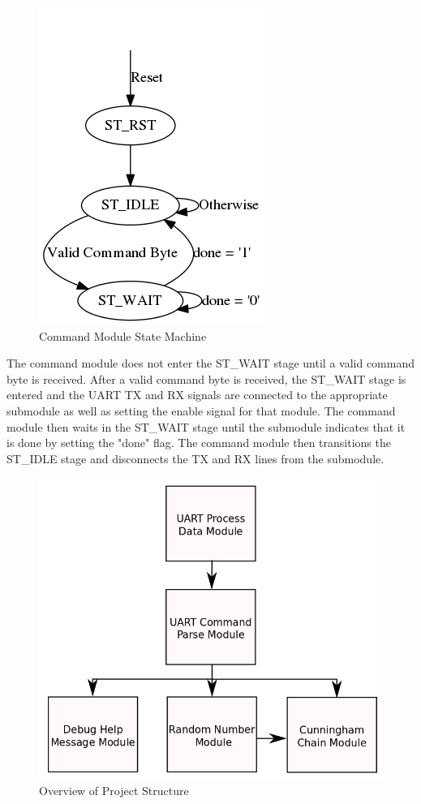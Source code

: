 \documentclass[journal]{IEEEtran}
\begin{document}
	\begin{figure}[h]
		\centering
		\includegraphics[scale=0.35]{graphviz/command_parse_state_diagram.png}
		\caption{Command Module State Machine}
	\end{figure}  

The command module does not enter the ST\_WAIT stage until a valid command byte is received. After a valid command byte is received, the ST\_WAIT stage is entered and the UART TX and RX signals are connected to the appropriate submodule as well as setting the enable signal for that module. The command module then waits in the ST\_WAIT stage until the submodule indicates that it is done by setting the "done" flag. The command module then transitions the ST\_IDLE stage and disconnects the TX and RX lines from the submodule. \\

	\begin{figure}[h]
		\centering
		\includegraphics[scale=0.3]{diagrams/project_overview.png}
		\caption{Overview of Project Structure}
		\label{project_overview}
	\end{figure}
\end{document}

